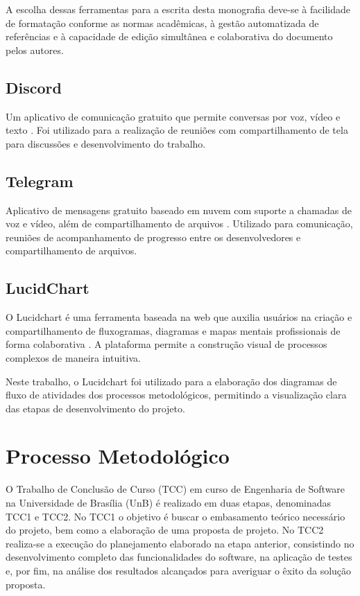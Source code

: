 A escolha dessas ferramentas para a escrita desta monografia deve-se à facilidade de formatação conforme as normas acadêmicas, à gestão automatizada de referências e à capacidade de edição simultânea e colaborativa do documento pelos autores.

\subsection[Discord]{Discord}
Um aplicativo de comunicação gratuito que permite conversas por voz, vídeo e texto \cite{pearson2025discord}. Foi utilizado para a realização de reuniões com compartilhamento de tela para discussões e desenvolvimento do trabalho.

\subsection[Telegram]{Telegram}
Aplicativo de mensagens gratuito baseado em nuvem com suporte a chamadas de voz e vídeo, além de compartilhamento de arquivos \cite{telegram2025}. Utilizado para comunicação, reuniões de acompanhamento de progresso entre os desenvolvedores e compartilhamento de arquivos.

\subsection[LucidChart]{LucidChart}
O Lucidchart é uma ferramenta baseada na web que auxilia usuários na criação e compartilhamento de fluxogramas, diagramas e mapas mentais profissionais de forma colaborativa \cite{lucidchart}. A plataforma permite a construção visual de processos complexos de maneira intuitiva.

Neste trabalho, o Lucidchart foi utilizado para a elaboração dos diagramas de fluxo de atividades dos processos metodológicos, permitindo a visualização clara das etapas de desenvolvimento do projeto.

\section[Processo Metodológico]{Processo Metodológico}

O Trabalho de Conclusão de Curso (TCC) em curso de Engenharia de Software na Universidade de Brasília (UnB) é realizado em duas etapas, denominadas TCC1 e TCC2. No TCC1 o objetivo é buscar o embasamento teórico necessário do projeto, bem como a elaboração de uma proposta de projeto. No TCC2 realiza-se a execução do planejamento elaborado na etapa anterior, consistindo no desenvolvimento completo das funcionalidades do software, na aplicação de testes e, por fim, na análise dos resultados alcançados para averiguar o êxito da solução proposta.

